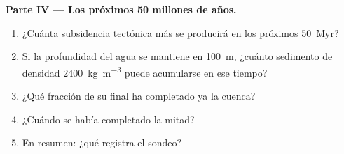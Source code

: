 \begin{problem}
\noindent\textbf{Parte IV --- Los próximos 50 millones de años.}
\begin{enumerate}[resume]
  \item ¿Cuánta subsidencia tectónica más se producirá en los próximos \qty{50}{Myr}?
  \item Si la profundidad del agua se mantiene en \qty{100}{m}, ¿cuánto sedimento de densidad
        \qty{2400}{kg.m^{-3}} puede acumularse en ese tiempo?
  \item ¿Qué fracción de su  final ha completado ya la cuenca?
  \item ¿Cuándo se había completado la mitad?
  \item En resumen: ¿qué  registra el sondeo?
\end{enumerate}
\end{problem}
